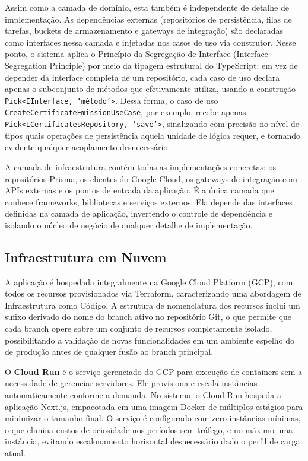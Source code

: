 \documentclass[article,a4paper,12pt,brazil,sumario=tradicional]{abntex2}
\begin{document}
Assim como a camada de domínio, esta também é independente de detalhe de implementação. As dependências externas (repositórios de persistência, filas de tarefas, buckets de armazenamento e gateways de integração) são declaradas como interfaces nessa camada e injetadas nos casos de uso via construtor. Nesse ponto, o sistema aplica o Princípio da Segregação de Interface (Interface Segregation Principle) por meio da tipagem estrutural do TypeScript: em vez de depender da interface completa de um repositório, cada caso de uso declara apenas o subconjunto de métodos que efetivamente utiliza, usando a construção \texttt{Pick\textless{}IInterface, `método'\textgreater{}}. Dessa forma, o caso de uso \texttt{CreateCertificateEmissionUseCase}, por exemplo, recebe apenas \texttt{Pick\textless{}ICertificatesRepository, `save'\textgreater{}}, sinalizando com precisão no nível de tipos quais operações de persistência aquela unidade de lógica requer, e tornando evidente qualquer acoplamento desnecessário.

A camada de infraestrutura contém todas as implementações concretas: os repositórios Prisma, os clientes do Google Cloud, os gateways de integração com APIs externas e os pontos de entrada da aplicação. É a única camada que conhece frameworks, bibliotecas e serviços externos. Ela depende das interfaces definidas na camada de aplicação, invertendo o controle de dependência e isolando o núcleo de negócio de qualquer detalhe de implementação.

\subsection{Infraestrutura em Nuvem}

A aplicação é hospedada integralmente na Google Cloud Platform (GCP), com todos os recursos provisionados via Terraform, caracterizando uma abordagem de Infraestrutura como Código. A estrutura de nomenclatura dos recursos inclui um sufixo derivado do nome do branch ativo no repositório Git, o que permite que cada branch opere sobre um conjunto de recursos completamente isolado, possibilitando a validação de novas funcionalidades em um ambiente espelho do de produção antes de qualquer fusão ao branch principal.

O \textbf{Cloud Run} é o serviço gerenciado do GCP para execução de containers sem a necessidade de gerenciar servidores. Ele provisiona e escala instâncias automaticamente conforme a demanda. No sistema, o Cloud Run hospeda a aplicação Next.js, empacotada em uma imagem Docker \cite{docker} de múltiplos estágios para minimizar o tamanho final. O serviço é configurado com zero instâncias mínimas, o que elimina custos de ociosidade nos períodos sem tráfego, e no máximo uma instância, evitando escalonamento horizontal desnecessário dado o perfil de carga atual.
\end{document}
